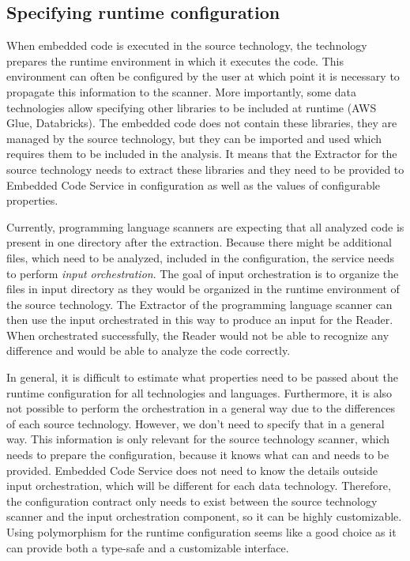 \subsection{Specifying runtime configuration}
When embedded code is executed in the source technology, the technology prepares the runtime environment in which it executes the code. This environment can often be configured by the user at which point it is necessary to propagate this information to the scanner. More importantly, some data technologies allow specifying other libraries to be included at runtime (AWS Glue, Databricks). The embedded code does not contain these libraries, they are managed by the source technology, but they can be imported and used which requires them to be included in the analysis. It means that the Extractor for the source technology needs to extract these libraries and they need to be provided to Embedded Code Service in configuration as well as the values of configurable properties.
\par
Currently, programming language scanners are expecting that all analyzed code is present in one directory after the extraction. Because there might be additional files, which need to be analyzed, included in the configuration, the service needs to perform \textit{input orchestration}. The goal of input orchestration is to organize the files in input directory as they would be organized in the runtime environment of the source technology. The Extractor of the programming language scanner can then use the input orchestrated in this way to produce an input for the Reader. When orchestrated successfully, the Reader would not be able to recognize any difference and would be able to analyze the code correctly.
\par
In general, it is difficult to estimate what properties need to be passed about the runtime configuration for all technologies and languages. Furthermore, it is also not possible to perform the orchestration in a general way due to the differences of each source technology. However, we don’t need to specify that in a general way. This information is only relevant for the source technology scanner, which needs to prepare the configuration, because it knows what can and needs to be provided. Embedded Code Service does not need to know the details outside input orchestration, which will be different for each data technology. Therefore, the configuration contract only needs to exist between the source technology scanner and the input orchestration component, so it can be highly customizable. Using polymorphism for the runtime configuration seems like a good choice as it can provide both a type-safe and a customizable interface.

